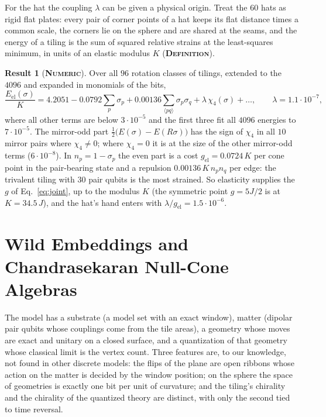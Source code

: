 \documentclass[11pt]{article}
\newcommand{\numeric}{\textbf{\textsc{Numeric}}}
\newcommand{\defn}{\textbf{\textsc{Definition}}}
\theoremstyle{definition}
\newtheorem{result}{Result}
\begin{document}
For the hat the coupling $\lambda$ can be given a physical origin. Treat the $60$ hats as rigid flat plates: every pair of corner points of a hat keeps its flat distance times a common scale, the corners lie on the sphere and are shared at the seams, and the energy of a tiling is the sum of squared relative strains at the least-squares minimum, in units of an elastic modulus $K$ (\defn).
\begin{result}[\numeric]\label{res:elastic}
Over all $96$ rotation classes of tilings, extended to the $4096$ and expanded in monomials of the bits,
\begin{equation}\label{eq:elastic}
\frac{E_{\mathrm{el}}(\sigma)}{K}=4.2051-0.0792\sum_p\sigma_p+0.00136\sum_{\langle pq\rangle}\sigma_p\sigma_q+\lambda\,\chi_4(\sigma)+\dots,\qquad \lambda=1.1\cdot10^{-7},
\end{equation}
where all other terms are below $3\cdot10^{-5}$ and the first three fit all $4096$ energies to $7\cdot10^{-5}$. The mirror-odd part $\tfrac12\bigl(E(\sigma)-E(R\sigma)\bigr)$ has the sign of $\chi_4$ in all $10$ mirror pairs where $\chi_4\neq0$; where $\chi_4=0$ it is at the size of the other mirror-odd terms ($6\cdot10^{-8}$). In $n_p=1-\sigma_p$ the even part is a cost $g_{\mathrm{el}}=0.0724\,K$ per cone point in the pair-bearing state and a repulsion $0.00136\,K\,n_pn_q$ per edge: the trivalent tiling with $30$ pair qubits is the most strained. So elasticity supplies the $g$ of Eq.~\eqref{eq:joint}, up to the modulus $K$ (the symmetric point $g=5J/2$ is at $K=34.5\,J$), and the hat's hand enters with $\lambda/g_{\mathrm{el}}=1.5\cdot10^{-6}$.
\end{result}

\section{Wild Embeddings and Chandrasekaran Null-Cone Algebras}
\label{sec:discussion}

The model has a substrate (a model set with an exact window), matter (dipolar pair qubits whose couplings come from the tile areas), a geometry whose moves are exact and unitary on a closed surface, and a quantization of that geometry whose classical limit is the vertex count. Three features are, to our knowledge, not found in other discrete models: the flips of the plane are open ribbons whose action on the matter is decided by the window position; on the sphere the space of geometries is exactly one bit per unit of curvature; and the tiling's chirality and the chirality of the quantized theory are distinct, with only the second tied to time reversal.
\end{document}
